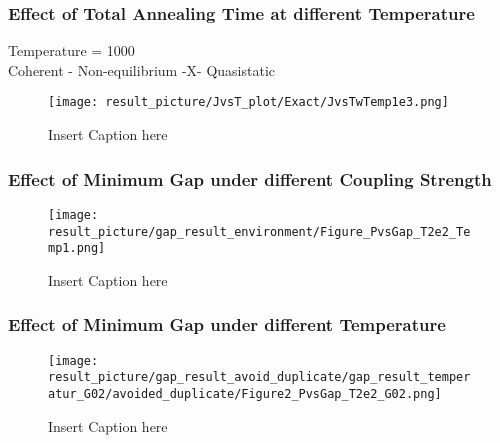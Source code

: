 \documentclass{beamer}
\begin{document}
\begin{frame}
	\frametitle{Effect of Total Annealing Time at different Temperature}
	Temperature = 1000\\
	Coherent - Non-equilibrium -X- Quasistatic
	\begin{figure}
		\centering
		\texttt{[image: result\_picture/JvsT\_plot/Exact/JvsTwTemp1e3.png]}
		\caption{Insert Caption here}
	\end{figure}
\end{frame}

\begin{frame}
	\frametitle{Effect of Minimum Gap under different Coupling Strength }

	\begin{figure}
		\centering
		\texttt{[image: result\_picture/gap\_result\_environment/Figure\_PvsGap\_T2e2\_Temp1.png]}
		
		\caption{Insert Caption here}
	\end{figure}
\end{frame}

\begin{frame}
	\frametitle{Effect of Minimum Gap under different Temperature }
	
	\begin{figure}
		\centering
		\texttt{[image: result\_picture/gap\_result\_avoid\_duplicate/gap\_result\_temperatur\_G02/avoided\_duplicate/Figure2\_PvsGap\_T2e2\_G02.png]}	
		\caption{Insert Caption here}
	\end{figure}
\end{frame}





\end{document}
